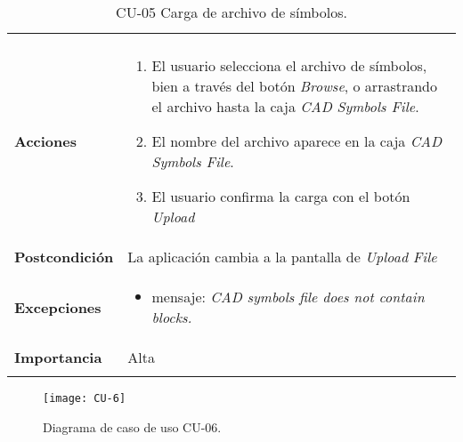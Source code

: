 \begin{longtable}[H]{@{}ll@{}}
\begin{minipage}[t]{0.71\columnwidth}
\end{minipage}\tabularnewline
\begin{minipage}[t]{0.23\columnwidth}\raggedright\strut
\textbf{Acciones}\strut
\end{minipage} & \begin{minipage}[t]{0.71\columnwidth}\raggedright\strut
\begin{enumerate}
\def\labelenumi{\arabic{enumi}.}
\tightlist
\item
  El usuario selecciona el archivo de símbolos, bien a través del botón \emph{Browse}, o arrastrando el archivo hasta la caja \emph{CAD Symbols File}.
\item
  El nombre del archivo aparece en la caja \emph{CAD Symbols File}.
\item
  El usuario confirma la carga con el botón \emph{Upload}
\end{enumerate}\strut
\end{minipage}\tabularnewline
\begin{minipage}[t]{0.23\columnwidth}\raggedright
\textbf{Postcondición}\strut
\end{minipage} & \begin{minipage}[t]{0.71\columnwidth}\raggedright\strut
La aplicación cambia a la pantalla de \emph{Upload File}
\end{minipage}\tabularnewline
\begin{minipage}[t]{0.23\columnwidth}\raggedright\strut
\textbf{Excepciones}
\end{minipage} & \begin{minipage}[t]{0.71\columnwidth}%
\begin{itemize}
\tightlist
\item
  mensaje: \textit{CAD symbols file does not contain blocks.}

\end{itemize}\strut
\end{minipage}\tabularnewline
\begin{minipage}[t]{0.23\columnwidth}\raggedright\strut
\textbf{Importancia}\strut
\end{minipage} & \begin{minipage}[t]{0.71\columnwidth}\raggedright\strut
Alta\strut
\end{minipage}\tabularnewline
\bottomrule
\caption{CU-05 Carga de archivo de símbolos.}
\end{longtable}

\begin{figure}[H]
	\centering
	\texttt{[image: CU-6]}
	\caption{Diagrama de caso de uso CU-06.}
	\label{fig:CU-6}
\end{figure}


